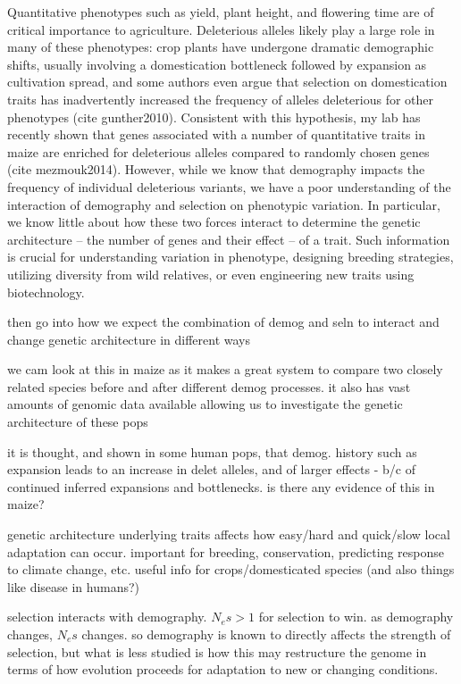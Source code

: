 Quantitative phenotypes such as yield, plant height, and flowering time are of critical importance to agriculture.  
Deleterious alleles likely play a large role in many of these phenotypes: crop plants have undergone dramatic demographic shifts, usually involving a domestication bottleneck followed by expansion as cultivation spread, and some authors even argue that selection on domestication traits has inadvertently increased the frequency of alleles deleterious for other phenotypes (cite gunther2010). 
Consistent with this hypothesis, my lab has recently shown that genes associated with a number of quantitative traits in maize are enriched for deleterious alleles  compared to randomly chosen genes (cite mezmouk2014).
However, while we know that demography impacts the frequency of individual deleterious variants, we have a poor understanding of the interaction of demography and selection on phenotypic variation. 
In particular, we know little about how these two forces interact to determine the genetic architecture -- the number of genes and their effect -- of a trait. 
Such information is crucial for understanding variation in phenotype, designing breeding strategies, utilizing diversity from wild relatives, or even engineering new traits using biotechnology. 






then go into how we expect the combination of demog and seln to interact and change genetic architecture in different ways

we cam look at this in maize as it makes a great system to compare two closely related species before and after different demog processes. it also has vast amounts of genomic data available allowing us to investigate the genetic architecture of these pops


it is thought, and shown in some human pops, that demog. history such as expansion leads to an increase in delet alleles, and of larger effects - b/c of continued inferred expansions and bottlenecks. 
is there any evidence of this in maize?



	
genetic architecture underlying traits affects how easy/hard and quick/slow local adaptation can occur. important for breeding, conservation, predicting response to climate change, etc.
useful info for crops/domesticated species (and also things like disease in humans?)
	
selection interacts with demography. $N_es>1$ for selection to win.
as demography changes, $N_es$ changes.
so demography is known to directly affects the strength of selection, but what is less studied is how this may restructure the genome in terms of how evolution proceeds for adaptation to new or changing conditions.

